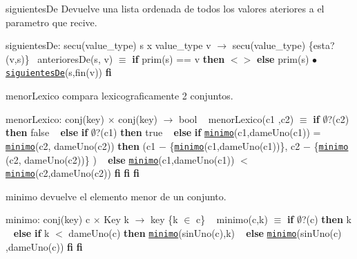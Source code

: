 \begin{DoxyParagraph}{siguientes\+De}
Devuelve una lista ordenada de todos los valores ateriores a el parametro que recive.

siguientes\+De\+: secu(value\+\_\+type) s x value\+\_\+type v $\to$ secu(value\+\_\+type) \{esta?(v,s)\}~\newline
 anteriores\+De(s, v) $\equiv$ {\bfseries if} prim(s) == v {\bfseries then} $<$$>$ {\bfseries else} prim(s) $\bullet$ \href{axiomas.html#siguientesDe}{\tt siguientes\+De}(s,fin(v)) {\bfseries fi} 
\end{DoxyParagraph}


\begin{DoxyParagraph}{menor\+Lexico}
compara lexicograficamente 2 conjuntos.

menor\+Lexico\+: conj(key) $\times$ conj(key) $\to$ bool ~\newline
 menor\+Lexico(c1 ,c2) $\equiv$ {\bfseries if} $\emptyset$?(c2) {\bfseries then} false ~\newline
 {\bfseries else} {\bfseries if} $\emptyset$?(c1) {\bfseries then} true ~\newline
 {\bfseries else} {\bfseries if} \href{axiomas.html#minimo}{\tt minimo}(c1,dame\+Uno(c1)) = \href{axiomas.html#minimo}{\tt minimo}(c2, dame\+Uno(c2)) {\bfseries then} (c1 $-$ \{\href{axiomas.html#minimo}{\tt minimo}(c1,dame\+Uno(c1))\}, c2 $-$ \{\href{axiomas.html#minimo}{\tt minimo} (c2, dame\+Uno(c2))\} ) ~\newline
 {\bfseries else} \href{axiomas.html#minimo}{\tt minimo}(c1,dame\+Uno(c1)) $<$ \href{axiomas.html#minimo}{\tt minimo}(c2,dame\+Uno(c2)) {\bfseries fi} {\bfseries fi} {\bfseries fi} 
\end{DoxyParagraph}


\begin{DoxyParagraph}{minimo}
devuelve el elemento menor de un conjunto.

minimo\+: conj(key) c $\times$ Key k $\to$ key \{k $\in$ c\} ~\newline
 minimo(c,k) $\equiv$ {\bfseries if} $\emptyset$?(c) {\bfseries then} k ~\newline
 {\bfseries else} {\bfseries if} k $<$ dame\+Uno(c) {\bfseries then} \href{axiomas.html#minimo}{\tt minimo}(sin\+Uno(c),k) ~\newline
 {\bfseries else} \href{axiomas.html#minimo}{\tt minimo}(sin\+Uno(c) ,dame\+Uno(c)) {\bfseries fi} {\bfseries fi} 
\end{DoxyParagraph}


